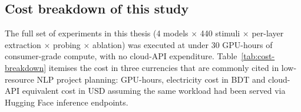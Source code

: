 \subsection*{Cost breakdown of this study}

The full set of experiments in this thesis (4 models $\times$ 440 stimuli $\times$ per-layer extraction $\times$ probing $\times$ ablation) was executed at under 30 GPU-hours of consumer-grade compute, with no cloud-API expenditure. Table~\ref{tab:cost-breakdown} itemises the cost in three currencies that are commonly cited in low-resource NLP project planning: GPU-hours, electricity cost in BDT and cloud-API equivalent cost in USD assuming the same workload had been served via Hugging Face inference endpoints.

\begin{table}[H]
\centering
\caption{Cost breakdown of the full DysLex-Probe pipeline. GPU-hours include representation extraction, probing, RSA and ablation across the four models. Electricity assumes 350~W average draw on a single consumer GPU at the Bangladesh residential rate of BDT 11.5/kWh. Cloud-API equivalent uses Hugging Face Inference Endpoints list pricing for comparable model classes.}
\label{tab:cost-breakdown}
\small
{}
\end{table}

